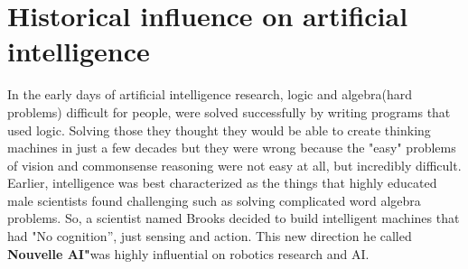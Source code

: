 \documentclass[10pt,a4paper,twoside]{article}
\begin{document}
\section*{Historical influence on artificial intelligence}
In the early days of artificial intelligence research, logic and algebra(hard problems) difficult for people, were solved successfully by writing programs that used logic. Solving those they thought they would be able to create thinking machines in just a few decades but they were wrong because the "easy" problems of vision and commonsense reasoning were not easy at all, but incredibly difficult.\\
Earlier, intelligence was best characterized as the things that highly educated male scientists found challenging such as solving complicated word algebra problems. So, a scientist named Brooks decided to build intelligent machines that had "No cognition”, just sensing and action. This new direction he called \textbf{Nouvelle AI"}was highly influential on robotics research and AI. 
\end{document}
